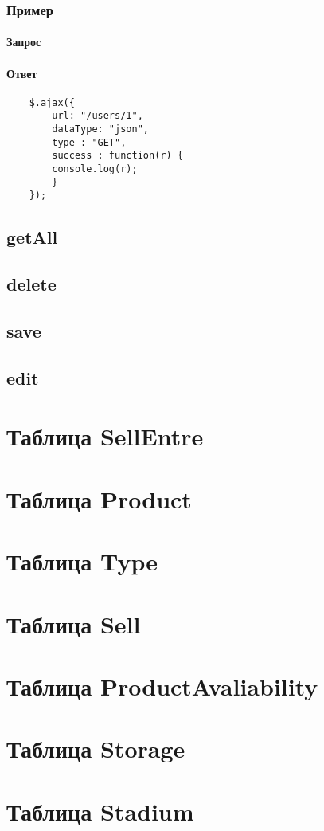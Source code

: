 \documentclass[14pt,a4paper,report]{report}
\begin{document}
\section*{Пример}

\subsection*{Запрос}
\subsection*{Ответ}

\begin{lstlisting}
	$.ajax({
    	url: "/users/1",
    	dataType: "json",
    	type : "GET",
    	success : function(r) {
      	console.log(r);
    	}
  	});
\end{lstlisting}


\chapter{getAll}



\chapter{delete}



\chapter{save}


\chapter{edit}



\part{Таблица SellEntre}
\part{Таблица Product}
\part{Таблица Type}
\part{Таблица Sell}
\part{Таблица ProductAvaliability}
\part{Таблица Storage}
\part{Таблица Stadium}
\end{document}
